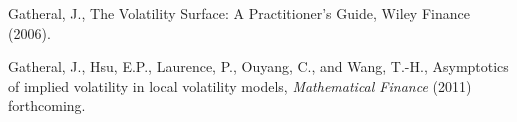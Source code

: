 \documentclass[12pt]{article}
\newtheorem{remark}{Remark}[section]
\newtheorem{theorem}{Theorem}[section]
\newtheorem{cor}{Corollary}[section]
\numberwithin{equation}{section}
\begin{document}



















%
%
%
%

\begin{thebibliography}{}


 { Gatheral, J.},
{The Volatility Surface: A Practitioner's Guide},
{Wiley Finance} (2006).

{ Gatheral, J.}, { Hsu, E.P.}, { Laurence, P.}, { Ouyang, C.}, and { Wang, T.-H.},
{Asymptotics of implied volatility in local volatility models},
{\it Mathematical Finance} (2011) forthcoming.



\end{thebibliography}
\end{document}
